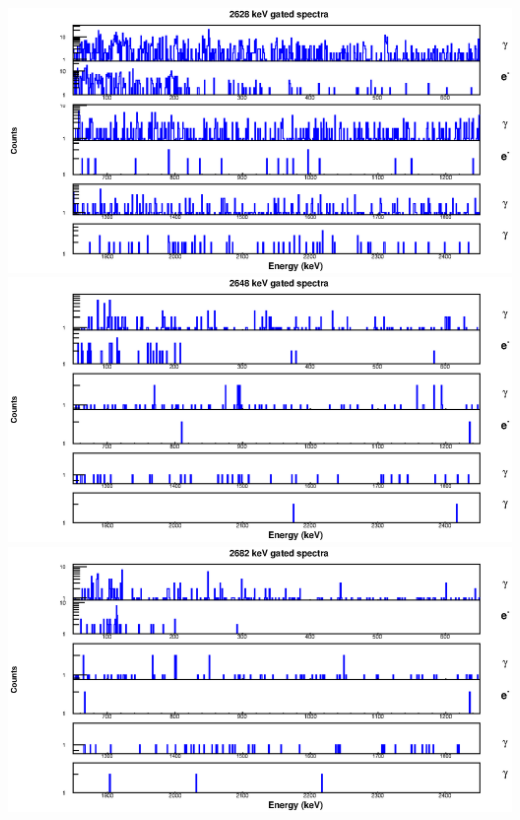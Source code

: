 \begin{landscape}
\includegraphics[scale=1.2]{154Gd_Appendix/2628_combined.eps}
\includegraphics[scale=1.2]{154Gd_Appendix/2648_combined.eps}
\includegraphics[scale=1.2]{154Gd_Appendix/2682_combined.eps}
\end{landscape}